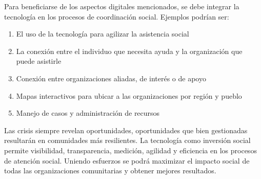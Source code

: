 \vspace{1em}
\par Para beneficiarse de los aspectos digitales mencionados, se debe integrar la tecnología en los procesos de coordinación social. Ejemplos podrían ser:
\begin{enumerate}
    \item El uso de la tecnología para agilizar la asistencia social
    \item La conexión entre el individuo que necesita ayuda y la organización que puede asistirle
    \item Conexión entre organizaciones aliadas, de interés o de apoyo
    \item Mapas interactivos para ubicar a las organizaciones por región y pueblo
    \item Manejo de casos y administración de recursos
\end{enumerate}
\vspace{1em}
\par Las crisis siempre revelan oportunidades, oportunidades que bien gestionadas resultarán en comunidades más resilientes. La tecnología como inversión social permite visibilidad, transparencia, medición, agilidad y eficiencia en los procesos de atención social. Uniendo esfuerzos se podrá maximizar el impacto social de todas las organizaciones comunitarias y obtener mejores resultados.
\clearpage
